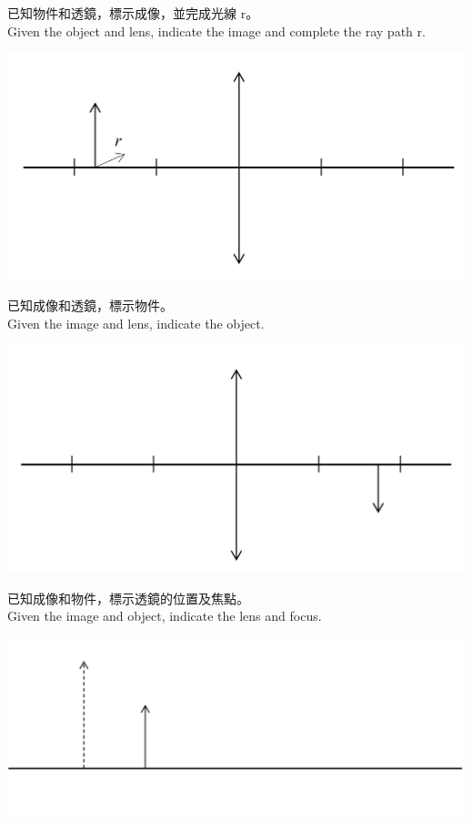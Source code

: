 \documentclass[class=exam, crop=false]{standalone}
\begin{document}


\begin{questions}
    \filbreak\question
    已知物件和透鏡，標示成像，並完成光線 r。\\
    Given the object and lens, indicate the image and complete the ray path r.
    \par{\par\centering\includegraphics[width=.7\textwidth]{./img/ch45ex_2024-04-26-22-32-45.png}\par}

    \filbreak\question
    已知成像和透鏡，標示物件。\\ Given the image and lens, indicate the object.
    \par{\par\centering\includegraphics[width=.7\textwidth]{./img/ch45ex_2024-04-26-22-34-13.png}\par}

    \filbreak\question
    已知成像和物件，標示透鏡的位置及焦點。\\Given the image and object, indicate the lens and focus.
    \par{\par\centering\includegraphics[width=.8\textwidth]{./img/ch45ex_2024-04-26-22-36-29.png}\par}


\end{questions}
\end{document}
